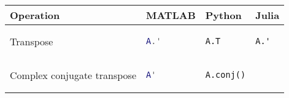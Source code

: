 \documentclass[10pt, landscape]{article}
\begin{document}
\begin{multicols}{2}
\begin{tabular}[]{@{}llll@{}}
\toprule
\begin{minipage}[b]{0.24\columnwidth}\raggedright
Operation
\end{minipage} & \begin{minipage}[b]{0.23\columnwidth}\raggedright
MATLAB
\end{minipage} & \begin{minipage}[b]{0.20\columnwidth}\raggedright
Python
\end{minipage} & \begin{minipage}[b]{0.20\columnwidth}\raggedright
Julia
\end{minipage}\tabularnewline
\midrule
\begin{minipage}[t]{0.24\columnwidth}\raggedright
Transpose
\end{minipage} & \begin{minipage}[t]{0.23\columnwidth}\raggedright
\begin{lstlisting}[language=Matlab]
A.'
\end{lstlisting}

\end{minipage} & \begin{minipage}[t]{0.20\columnwidth}\raggedright
\begin{lstlisting}[language=Python]
A.T
\end{lstlisting}

\end{minipage} & \begin{minipage}[t]{0.20\columnwidth}\raggedright
\begin{lstlisting}
A.'
\end{lstlisting}

\end{minipage}\tabularnewline
\begin{minipage}[t]{0.24\columnwidth}\raggedright
Complex conjugate transpose
\end{minipage} & \begin{minipage}[t]{0.23\columnwidth}\raggedright
\begin{lstlisting}[language=Matlab]
A'
\end{lstlisting}

\end{minipage} & \begin{minipage}[t]{0.20\columnwidth}\raggedright
\begin{lstlisting}[language=Python]
A.conj()
\end{lstlisting}


\end{minipage}
\end{tabular}
\end{multicols}
\end{document}
